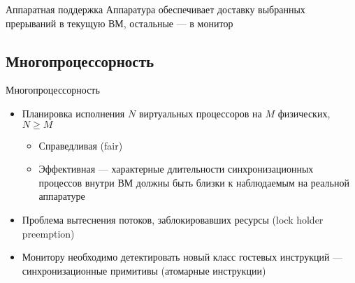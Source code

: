\begin{frame}{Аппаратная поддержка}
Аппаратура обеспечивает доставку выбранных прерываний в текущую ВМ, остальные — в монитор

\vfill
\centering
{}

\end{frame}

\subsection{Многопроцессорность}

\begin{frame}{Многопроцессорность}
\begin{itemize}
    \item Планировка исполнения $N$ виртуальных процессоров на $M$ физических, $N \geqslant M$
    \begin{itemize}
        \item Справедливая (fair)
        \item Эффективная — характерные длительности синхронизационных процессов внутри ВМ должны быть близки к наблюдаемым на реальной аппаратуре
    \end{itemize}
\end{itemize}

\begin{itemize}
    \item Проблема вытеснения потоков, заблокировавших ресурсы (lock holder preemption)
    \item Монитору необходимо детектировать новый класс гостевых инструкций — синхронизационные примитивы (атомарные инструкции)
\end{itemize}

\end{frame}

